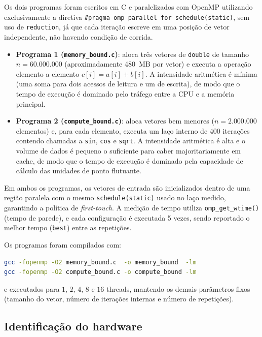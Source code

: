 \documentclass[a4paper,12pt]{article}
\begin{document}
Os dois programas foram escritos em C e paralelizados com OpenMP utilizando
exclusivamente a diretiva \texttt{\#pragma omp parallel for schedule(static)},
sem uso de \texttt{reduction}, já que cada iteração escreve em uma posição de
vetor independente, não havendo condição de corrida.

\begin{itemize}
    \item \textbf{Programa 1 (\texttt{memory\_bound.c})}: aloca três vetores de
    \texttt{double} de tamanho $n = 60{.}000{.}000$ (aproximadamente 480~MB por
    vetor) e executa a operação elemento a elemento $c[i] = a[i] + b[i]$.
    A intensidade aritmética é mínima (uma soma para dois acessos de leitura e
    um de escrita), de modo que o tempo de execução é dominado pelo tráfego
    entre a CPU e a memória principal.

    \item \textbf{Programa 2 (\texttt{compute\_bound.c})}: aloca vetores bem
    menores ($n = 2{.}000{.}000$ elementos) e, para cada elemento, executa um
    laço interno de 400 iterações contendo chamadas a \texttt{sin}, \texttt{cos}
    e \texttt{sqrt}. A intensidade aritmética é alta e o volume de dados é
    pequeno o suficiente para caber majoritariamente em cache, de modo que o
    tempo de execução é dominado pela capacidade de cálculo das unidades de
    ponto flutuante.
\end{itemize}

Em ambos os programas, os vetores de entrada são inicializados dentro de uma
região paralela com o mesmo \texttt{schedule(static)} usado no laço medido,
garantindo a política de \emph{first-touch}. 
A medição de tempo utiliza \texttt{omp\_get\_wtime()}
(tempo de parede), e cada configuração é executada 5 vezes, sendo reportado o
melhor tempo (\texttt{best}) entre as repetições.

Os programas foram compilados com:
\begin{lstlisting}[style=cstyle, language=bash, numbers=none]
gcc -fopenmp -O2 memory_bound.c  -o memory_bound  -lm
gcc -fopenmp -O2 compute_bound.c -o compute_bound -lm
\end{lstlisting}

e executados para $1$, $2$, $4$, $8$ e $16$ threads, mantendo os demais
parâmetros fixos (tamanho do vetor, número de iterações internas e número de
repetições).

\subsection{Identificação do hardware}
\end{document}
